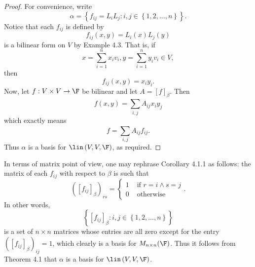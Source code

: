 \documentclass[math_245.tex]{subfiles}
\begin{document}
    \begin{proof}
        For convenience, write
        \begin{equation*}
            \alpha = \left\lbrace f_{ij}=L_iL_j: i,j\in \left\lbrace 1,2,\ldots,n \right\rbrace  \right\rbrace .
        \end{equation*}
        Notice that each $f_{ij}$ is defined by
        \begin{equation*}
            f_{ij}\left( x,y \right) = L_i(x)L_j(y)
        \end{equation*}
        is a bilinear form on $V$ by Example 4.3. That is, if
        \begin{equation*}
            x = \sum^{n}_{i=1} x_iv_i, y = \sum^{n}_{i=1} y_iv_i\in V,
        \end{equation*}
        then
        \begin{equation*}
            f_{ij} (x,y) = x_iy_i.
        \end{equation*}
        Now, let $f:V\times V\to\F$ be bilinear and let $A = \left[ f \right] _\beta$. Then
        \begin{equation*}
            f\left( x,y \right) = \sum^{}_{i,j} A_{ij}x_iy_j
        \end{equation*}
        which exactly means
        \begin{equation*}
            f = \sum^{}_{i,j} A_{ij}f_{ij}.
        \end{equation*}
        Thus $\alpha$ is a basis for $\lin\left( V,V,\F \right)$, as required.
    \end{proof}

    \begin{remark}
        In terms of matrix point of view, one may rephrase Corollary 4.1.1 as follows: the matrix of each $f_{ij}$ with respect to $\beta$ is such that
        \begin{equation*}
            \left( \left[ f_{ij} \right] _\beta \right) _{rs} =
            \begin{cases}
                1 & \text{ if } r = i \land s = j \\
                0 & \text{ otherwise} 
            \end{cases}.
        \end{equation*}
        In other words,
        \begin{equation*}
            \left\lbrace \left[ f_{ij} \right] _\beta : i,j\in \left\lbrace 1,2,\ldots,n \right\rbrace  \right\rbrace 
        \end{equation*}
        is a set of $n\times n$ matrices whose entries are all zero except for the entry $\left( \left[ f_{ij} \right] _\beta \right) _{ij} = 1$, which clearly is a basis for $M_{n\times n}(\F)$. Thus it follows from Theorem 4.1 that $\alpha$ is a basis for $\lin\left( V,V,\F \right)$.
    \end{remark}
\end{document}

